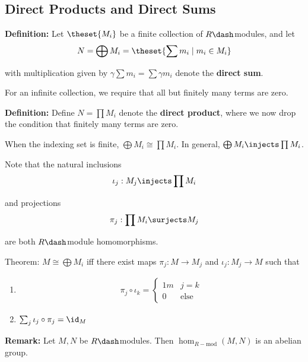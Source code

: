 \hypertarget{direct-products-and-direct-sums}{%
\subsection{Direct Products and Direct
Sums}\label{direct-products-and-direct-sums}}

\textbf{Definition:} Let \(\theset{M_i}\) be a finite collection of
\(R\dash\)modules, and let \begin{align*}
N = \bigoplus M_i = \theset{\sum m_i \mid m_i \in M_i}
\end{align*}

with multiplication given by \(\gamma \sum m_i = \sum \gamma m_i\)
denote the \textbf{direct sum}.

For an infinite collection, we require that all but finitely many terms
are zero.

\textbf{Definition:} Define \(N = \prod M_i\) denote the \textbf{direct
product}, where we now drop the condition that finitely many terms are
zero.

When the indexing set is finite, \(\bigoplus M_i \cong \prod M_i\). In
general, \(\bigoplus M_i \injects \prod M_i\).

Note that the natural inclusions
\begin{align*}
\iota_j: M_j \injects \prod M_i
\end{align*}

and projections
\begin{align*}
\pi_j: \prod M_i \surjects M_j
\end{align*}

are both \(R\dash\)module homomorphisms.

Theorem: \(M \cong \bigoplus M_i\) iff there exist maps
\(\pi_j: M \to M_j\) and \(\iota_j: M_j \to M\) such that

\begin{enumerate}
\def\labelenumi{\arabic{enumi}.}
\item

  \begin{align*}
  \pi_j \circ \iota_k = \begin{cases} 1m & j=k \\ 0 & \text{else}\end{cases}
  \end{align*}
\item
  \(\sum_j \iota_j \circ \pi_j = \id_M\)
\end{enumerate}

\textbf{Remark:} Let \(M, N\) be \(R\dash\)modules. Then
\(\hom_{R-\text{mod}}(M, N)\) is an abelian group.

